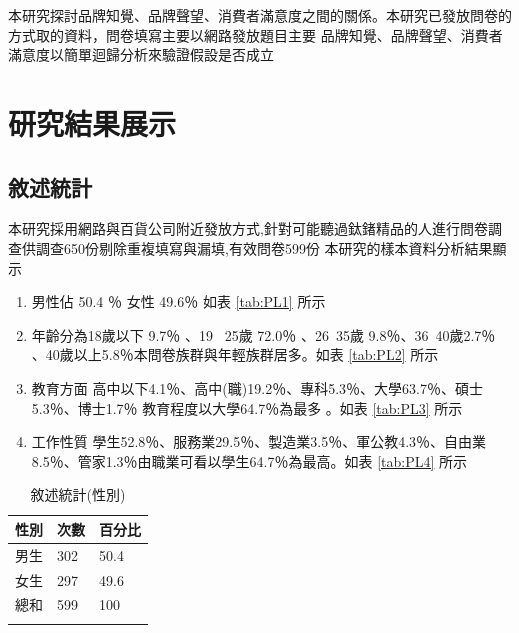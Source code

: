 本研究探討品牌知覺、品牌聲望、消費者滿意度之間的關係。本研究已發放問卷的方式取的資料，問卷填寫主要以網路發放題目主要
品牌知覺、品牌聲望、消費者滿意度以簡單迴歸分析來驗證假設是否成立

\chapter{研究結果展示}
\section{敘述統計}
本研究採用網路與百貨公司附近發放方式,針對可能聽過鈦鍺精品的人進行問卷調查供調查650份剔除重複填寫與漏填,有效問卷599份 
本研究的樣本資料分析結果顯示 
\begin{enumerate}
\item 男性佔 50.4 ％ 女性 49.6％ 如表 \ref{tab:PL1} 所示 
\item 年齡分為18歲以下 9.7％ 、19 ~25歲 72.0％ 、26~35歲 9.8％、36~40歲2.7％ 、40歲以上5.8％本問卷族群與年輕族群居多。如表  \ref{tab:PL2} 所示
\item 教育方面 高中以下4.1％、高中(職)19.2％、專科5.3％、大學63.7％、碩士5.3％、博士1.7％ 教育程度以大學64.7％為最多 。如表 \ref{tab:PL3} 所示
\item 工作性質 學生52.8％、服務業29.5％、製造業3.5％、軍公教4.3％、自由業8.5％、管家1.3％由職業可看以學生64.7％為最高。如表 \ref{tab:PL4} 所示
\end{enumerate}

\begin{table}[H]
\caption{敘述統計(性別)}
\label{tab:PL1}
\renewcommand{\arraystretch}{1.2} %
\arrayrulewidth=1pt               %
\tabcolsep=60pt                   %
%
\begin{tabular}[t]{lll}  %
\hline
 性別&次數 & 百分比 \\
\hline
男生        & 302 & 50.4 \\
女生        & 297  & 49.6 \\
總和        & 599  & 100 \\
\hline
\centering
\label{fig:PL4}
\end{tabular}
\end{table}

